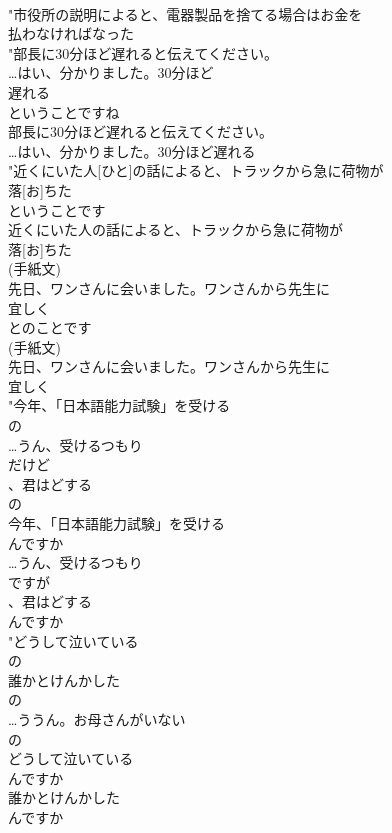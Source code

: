\documentclass[8pt]{extreport}
\begin{document}
\begin{CJK}{UTF8}{min}
\\	"市役所の説明によると、電器製品を捨てる場合はお金を
\\	払わなければなった
\\	"部長に30分ほど遅れると伝えてください。
\\	…はい、分かりました。30分ほど
\\	遅れる
\\	ということですね
\\	部長に30分ほど遅れると伝えてください。
\\	…はい、分かりました。30分ほど遅れる
\\	"近くにいた人[ひと]の話によると、トラックから急に荷物が
\\	落[お]ちた
\\	ということです
\\	近くにいた人の話によると、トラックから急に荷物が
\\	落[お]ちた
\\	(手紙文)
\\	先日、ワンさんに会いました。ワンさんから先生に
\\	宜しく
\\	とのことです
\\	(手紙文)
\\	先日、ワンさんに会いました。ワンさんから先生に
\\	宜しく
\\	"今年、「日本語能力試験」を受ける
\\	の
\\	…うん、受けるつもり
\\	だけど
\\	、君はどする
\\	の
\\	今年、「日本語能力試験」を受ける
\\	んですか
\\	…うん、受けるつもり
\\	ですが
\\	、君はどする
\\	んですか
\\	"どうして泣いている
\\	の
\\	誰かとけんかした
\\	の
\\	…ううん。お母さんがいない
\\	の
\\	どうして泣いている
\\	んですか
\\	誰かとけんかした
\\	んですか

\end{CJK}
\end{document}
